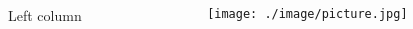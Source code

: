 \begin{columns}

  \begin{column}{0.5\textwidth}
  Left column
  \end{column}

  \begin{column}{0.5\textwidth}
    \begin{figure}
      \texttt{[image: ./image/picture.jpg]}
    \end{figure}
  \end{column}

\end{columns}
